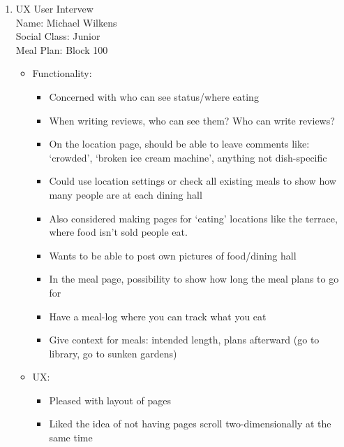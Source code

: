 \documentclass[5pt]{article} %
\begin{document}
\begin{enumerate}
\begin{itemize}
\end{itemize}
\item UX User Intervew \\
Name: Michael Wilkens \\
Social Class: Junior \\
Meal Plan: Block 100 \\
\begin{itemize}
\item Functionality:
\begin{itemize}
\item Concerned with who can see status/where eating
\item When writing reviews, who can see them? Who can write reviews?
\item On the location page, should be able to leave comments like: ‘crowded’, ‘broken ice cream machine’, anything not dish-specific
\item Could use location settings or check all existing meals to show how many people are at each dining hall
\item Also considered making pages for ‘eating’ locations like the terrace, where food isn’t sold people eat.
\item Wants to be able to post own pictures of food/dining hall
\item In the meal page, possibility to show how long the meal plans to go for
\item Have a meal-log where you can track what you eat
\item Give context for meals: intended length, plans afterward (go to library, go to sunken gardens)

\end{itemize}
\item UX:
\begin{itemize}
\item Pleased with layout of pages
\item Liked the idea of not having pages scroll two-dimensionally at the same time
\end{itemize}
\end{itemize}
\end{enumerate}
\end{document}
